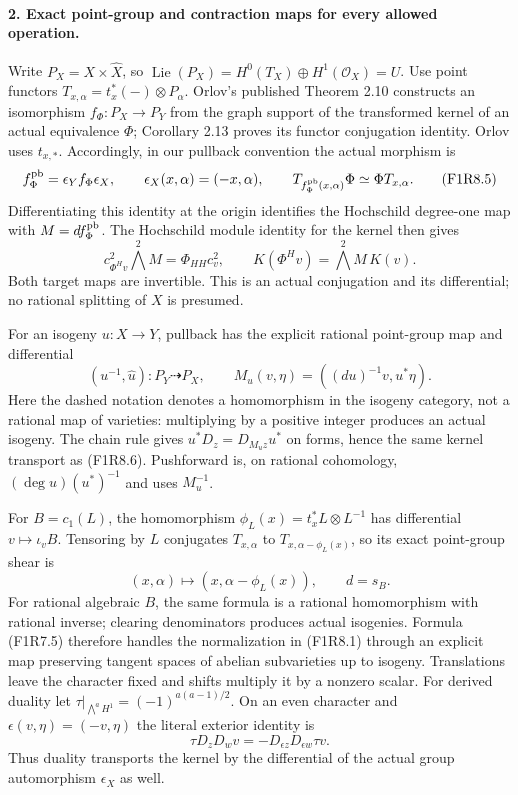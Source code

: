 \paragraph{2. Exact point-group and contraction maps for every allowed operation.}
Write $P_X=X\times\widehat X$, so
$\operatorname{Lie}(P_X)=H^0(T_X)\oplus H^1(\mathcal O_X)=U$.
Use point functors $T_{x,\alpha}=t_x^*(-)\otimes P_\alpha$.
Orlov's published Theorem 2.10 constructs an isomorphism
$f_\Phi:P_X\to P_Y$ from the graph support of the transformed
kernel of an actual equivalence $\Phi$; Corollary 2.13 proves
its functor conjugation identity. Orlov uses $t_{x,*}$.
Accordingly, in our pullback convention the actual morphism is
\[
 f_\Phi^{\rm pb}=\epsilon_Y f_\Phi\epsilon_X,
 \qquad\epsilon_X(x,\alpha)=(-x,\alpha),\qquad
 T_{f_\Phi^{\rm pb}(x,\alpha)}\Phi\simeq\Phi T_{x,\alpha}.
 \tag{F1R8.5}
\]
Differentiating this identity at the origin identifies the
Hochschild degree-one map with $M=d f_\Phi^{\rm pb}$. The
Hochschild module identity for the kernel then gives
\[
 c_{\Phi^H v}^2\bigwedge^2 M=\Phi_{HH}c_v^2,
 \qquad K(\Phi^H v)=\bigwedge^2 M\,K(v).
 \tag{F1R8.6}
\]
Both target maps are invertible. This is an actual conjugation
and its differential; no rational splitting of $X$ is presumed.

For an isogeny $u:X\to Y$, pullback has the explicit rational
point-group map and differential
\[
 (u^{-1},\widehat u):P_Y\dashrightarrow P_X,\qquad
 M_u(v,\eta)=((du)^{-1}v,u^*\eta).
 \tag{F1R8.7}
\]
Here the dashed notation denotes a homomorphism in the isogeny
category, not a rational map of varieties: multiplying by a
positive integer produces an actual isogeny. The chain rule
gives $u^*D_z=D_{M_uz}u^*$ on forms, hence the same kernel
transport as (F1R8.6). Pushforward is, on rational cohomology,
$(\deg u)(u^*)^{-1}$ and uses $M_u^{-1}$.

For $B=c_1(L)$, the homomorphism
$\phi_L(x)=t_x^*L\otimes L^{-1}$ has differential
$v\mapsto\iota_vB$. Tensoring by $L$ conjugates $T_{x,\alpha}$
to $T_{x,\alpha-\phi_L(x)}$, so its exact point-group shear is
\[
 (x,\alpha)\longmapsto(x,\alpha-\phi_L(x)),\qquad d=s_B.
 \tag{F1R8.8}
\]
For rational algebraic $B$, the same formula is a rational
homomorphism with rational inverse; clearing denominators
produces actual isogenies. Formula (F1R7.5) therefore handles
the normalization in (F1R8.1) through an explicit map preserving
tangent spaces of abelian subvarieties up to isogeny.
Translations leave the character fixed and shifts multiply it
by a nonzero scalar. For derived duality let
$\tau|_{\bigwedge^aH^1}=(-1)^{a(a-1)/2}$. On an even character
and $\epsilon(v,\eta)=(-v,\eta)$ the literal exterior identity is
\[
 \tau D_zD_w v=-D_{\epsilon z}D_{\epsilon w}\tau v.
 \tag{F1R8.9}
\]
Thus duality transports the kernel by the differential of the
actual group automorphism $\epsilon_X$ as well.

